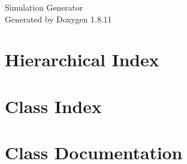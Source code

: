 \documentclass[twoside]{book}
\newcommand{\+}{\discretionary{\mbox{\scriptsize$\hookleftarrow$}}{}{}}
\newcommand{\clearemptydoublepage}{%
  \newpage{\pagestyle{empty}\cleardoublepage}%
}
\begin{document}
\hypersetup{pageanchor=false,
             bookmarksnumbered=true,
             pdfencoding=unicode
            }
\begin{titlepage}
\vspace*{7cm}
\begin{center}%
{\Large Simulation Generator }\\
\vspace*{1cm}
{\large Generated by Doxygen 1.8.11}\\
\end{center}
\end{titlepage}
\clearemptydoublepage
\tableofcontents
\clearemptydoublepage
{}
\hypersetup{pageanchor=true}

\chapter{Hierarchical Index}

\chapter{Class Index}

\chapter{Class Documentation}





















\backmatter
\newpage
{}
\clearemptydoublepage
{}
\printindex
\end{document}
